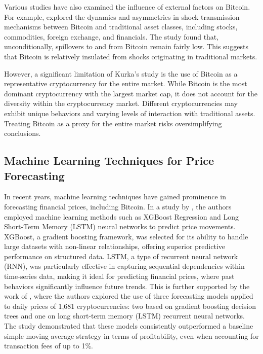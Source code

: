 Various studies have also examined the influence of external factors on Bitcoin. For example, \autocite{kurka2019cryptocurrencies} explored the dynamics and asymmetries in shock transmission mechanisms between Bitcoin and traditional asset classes, including stocks, commodities, foreign exchange, and financials. The study found that, unconditionally, spillovers to and from Bitcoin remain fairly low. This suggests that Bitcoin is relatively insulated from shocks originating in traditional markets.

However, a significant limitation of Kurka's study is the use of Bitcoin as a representative cryptocurrency for the entire market. While Bitcoin is the most dominant cryptocurrency with the largest market cap, it does not account for the diversity within the cryptocurrency market. Different cryptocurrencies may exhibit unique behaviors and varying levels of interaction with traditional assets. Treating Bitcoin as a proxy for the entire market risks oversimplifying conclusions.

\subsection{Machine Learning Techniques for Price Forecasting}

In recent years, machine learning techniques have gained prominence in forecasting financial prices, including Bitcoin. In a study by \textcite{lauraalessandretti2018anticipating}, the authors employed machine learning methods such as XGBoost Regression and Long Short-Term Memory (LSTM) neural networks to predict price movements. XGBoost, a gradient boosting framework, was selected for its ability to handle large datasets with non-linear relationships, offering superior predictive performance on structured data. LSTM, a type of recurrent neural network (RNN), was particularly effective in capturing sequential dependencies within time-series data, making it ideal for predicting financial prices, where past behaviors significantly influence future trends.
This is further supported by the work of \autocite{alessandretti2018anticipating}, where the authors explored the use of three forecasting models applied to daily prices of 1,681 cryptocurrencies: two based on gradient boosting decision trees and one on long short-term memory (LSTM) recurrent neural networks. The study demonstrated that these models consistently outperformed a baseline simple moving average strategy in terms of profitability, even when accounting for transaction fees of up to 1\%.

